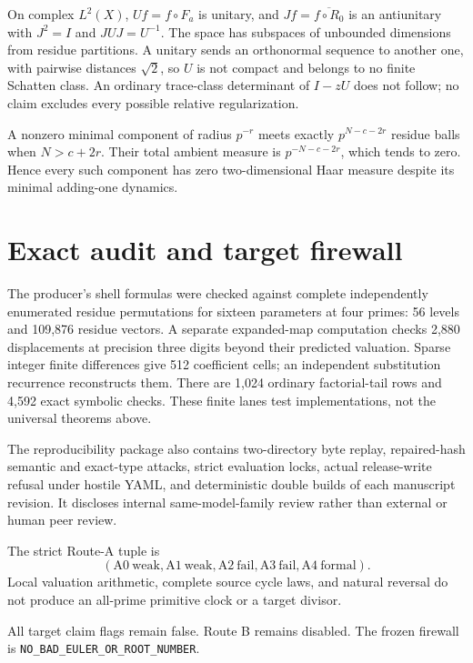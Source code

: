 \documentclass[10pt]{article}
\begin{document}
On complex $L^2(X)$, $Uf=f\circ F_a$ is unitary, and
$Jf=\overline{f\circ R_0}$ is an antiunitary with $J^2=I$ and
$JUJ=U^{-1}$. The space has subspaces of unbounded dimensions from
residue partitions. A unitary sends an orthonormal sequence to another
one, with pairwise distances $\sqrt2$, so $U$ is not compact and belongs
to no finite Schatten class. An ordinary trace-class determinant of
$I-zU$ does not follow; no claim excludes every possible relative
regularization.

A nonzero minimal component of radius $p^{-r}$ meets exactly
$p^{N-c-2r}$ residue balls when $N>c+2r$. Their total ambient measure is
$p^{-N-c-2r}$, which tends to zero. Hence every such component has
zero two-dimensional Haar measure despite its minimal adding-one dynamics.

\section{Exact audit and target firewall}
The producer's shell formulas were checked against complete independently
enumerated residue permutations for sixteen parameters at four primes:
56 levels and 109,876 residue vectors. A separate expanded-map computation
checks 2,880 displacements at precision three digits beyond their predicted
valuation. Sparse integer finite differences give 512 coefficient cells;
an independent substitution recurrence reconstructs them. There are 1,024
ordinary factorial-tail rows and 4,592 exact symbolic checks. These finite
lanes test implementations, not the universal theorems above.

The reproducibility package also contains two-directory byte replay,
repaired-hash semantic and exact-type attacks, strict evaluation locks,
actual release-write refusal under hostile YAML, and deterministic
double builds of each manuscript revision. It discloses internal
same-model-family review rather than external or human peer review.

The strict Route-A tuple is
\[
 (\mathrm{A0\ weak},\mathrm{A1\ weak},\mathrm{A2\ fail},
   \mathrm{A3\ fail},\mathrm{A4\ formal}).
\]
Local valuation arithmetic, complete source cycle laws, and natural
reversal do not produce an all-prime primitive clock or a target divisor.
\begin{samepage}
All target claim flags remain false.
Route B remains disabled.
The frozen firewall is \texttt{NO\_BAD\_EULER\_OR\_ROOT\_NUMBER}.
\end{samepage}
\fi
\end{document}

